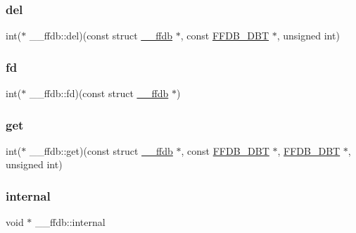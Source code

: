 \subsubsection{\texorpdfstring{del}{del}}
{\footnotesize\ttfamily int($\ast$ \+\_\+\+\_\+ffdb\+::del)(const struct \mbox{\hyperlink{struct____ffdb}{\+\_\+\+\_\+ffdb}} $\ast$, const \mbox{\hyperlink{other__libs_2filedb_2filehash_2ffdb__db_8h_aa2e0984399491df0fdd20898ca8758f9}{F\+F\+D\+B\+\_\+\+D\+BT}} $\ast$, unsigned int)}

\mbox{\label{struct____ffdb_a24c4b1701425fc71436f66031f40f784}} 
\subsubsection{\texorpdfstring{fd}{fd}}
{\footnotesize\ttfamily int($\ast$ \+\_\+\+\_\+ffdb\+::fd)(const struct \mbox{\hyperlink{struct____ffdb}{\+\_\+\+\_\+ffdb}} $\ast$)}

\mbox{\label{struct____ffdb_a8a7764381b955beff42d80df7d895f15}} 
\subsubsection{\texorpdfstring{get}{get}}
{\footnotesize\ttfamily int($\ast$ \+\_\+\+\_\+ffdb\+::get)(const struct \mbox{\hyperlink{struct____ffdb}{\+\_\+\+\_\+ffdb}} $\ast$, const \mbox{\hyperlink{other__libs_2filedb_2filehash_2ffdb__db_8h_aa2e0984399491df0fdd20898ca8758f9}{F\+F\+D\+B\+\_\+\+D\+BT}} $\ast$, \mbox{\hyperlink{other__libs_2filedb_2filehash_2ffdb__db_8h_aa2e0984399491df0fdd20898ca8758f9}{F\+F\+D\+B\+\_\+\+D\+BT}} $\ast$, unsigned int)}

\mbox{\label{struct____ffdb_af883642213f91052caf45c51b25dd69d}} 
\subsubsection{\texorpdfstring{internal}{internal}}
{\footnotesize\ttfamily void $\ast$ \+\_\+\+\_\+ffdb\+::internal}

\mbox{\label{struct____ffdb_a63b3f6dcb802e3ed86921fd618eeee52}} 
